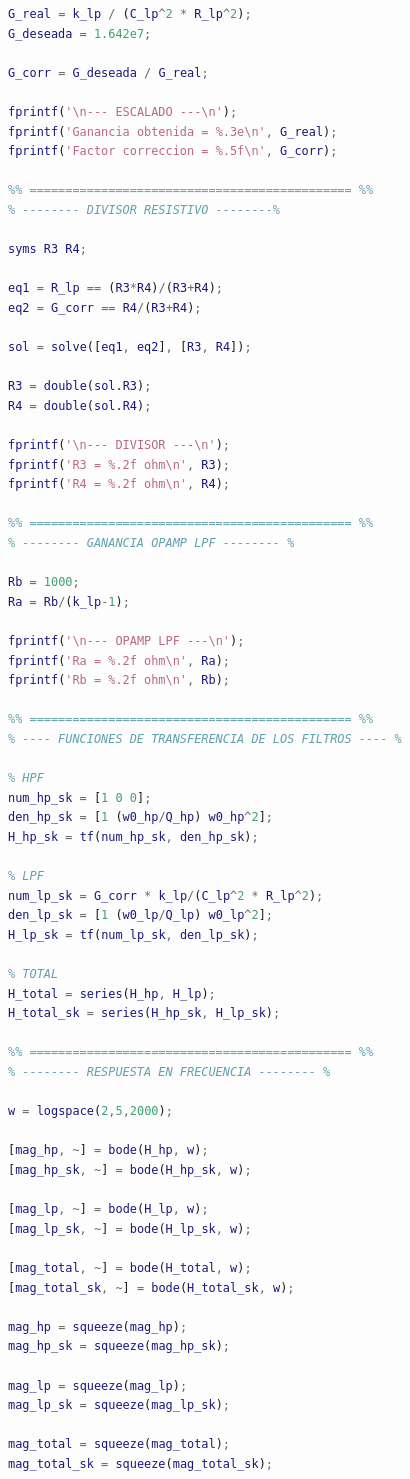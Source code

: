 \documentclass[12pt,a4paper]{article}
\begin{document}
\begin{lstlisting}[language=Matlab]
G_real = k_lp / (C_lp^2 * R_lp^2);
G_deseada = 1.642e7;

G_corr = G_deseada / G_real;

fprintf('\n--- ESCALADO ---\n');
fprintf('Ganancia obtenida = %.3e\n', G_real);
fprintf('Factor correccion = %.5f\n', G_corr);

%% ============================================= %%
% -------- DIVISOR RESISTIVO --------%

syms R3 R4;

eq1 = R_lp == (R3*R4)/(R3+R4);
eq2 = G_corr == R4/(R3+R4);

sol = solve([eq1, eq2], [R3, R4]);

R3 = double(sol.R3);
R4 = double(sol.R4);

fprintf('\n--- DIVISOR ---\n');
fprintf('R3 = %.2f ohm\n', R3);
fprintf('R4 = %.2f ohm\n', R4);

%% ============================================= %%
% -------- GANANCIA OPAMP LPF -------- %

Rb = 1000;
Ra = Rb/(k_lp-1);

fprintf('\n--- OPAMP LPF ---\n');
fprintf('Ra = %.2f ohm\n', Ra);
fprintf('Rb = %.2f ohm\n', Rb);

%% ============================================= %%
% ---- FUNCIONES DE TRANSFERENCIA DE LOS FILTROS ---- %

% HPF
num_hp_sk = [1 0 0];
den_hp_sk = [1 (w0_hp/Q_hp) w0_hp^2];
H_hp_sk = tf(num_hp_sk, den_hp_sk);

% LPF
num_lp_sk = G_corr * k_lp/(C_lp^2 * R_lp^2);
den_lp_sk = [1 (w0_lp/Q_lp) w0_lp^2];
H_lp_sk = tf(num_lp_sk, den_lp_sk);

% TOTAL
H_total = series(H_hp, H_lp);
H_total_sk = series(H_hp_sk, H_lp_sk);

%% ============================================= %%
% -------- RESPUESTA EN FRECUENCIA -------- %

w = logspace(2,5,2000);

[mag_hp, ~] = bode(H_hp, w);
[mag_hp_sk, ~] = bode(H_hp_sk, w);

[mag_lp, ~] = bode(H_lp, w);
[mag_lp_sk, ~] = bode(H_lp_sk, w);

[mag_total, ~] = bode(H_total, w);
[mag_total_sk, ~] = bode(H_total_sk, w);

mag_hp = squeeze(mag_hp);
mag_hp_sk = squeeze(mag_hp_sk);

mag_lp = squeeze(mag_lp);
mag_lp_sk = squeeze(mag_lp_sk);

mag_total = squeeze(mag_total);
mag_total_sk = squeeze(mag_total_sk);


\end{lstlisting}
\end{document}
